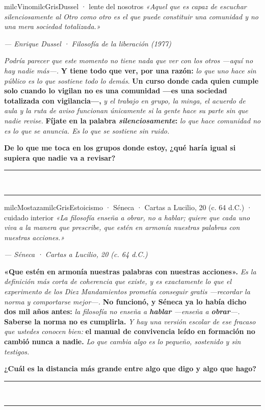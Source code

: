 \documentclass[11pt,letterpaper]{article}
\newcommand{\linead}[1]{\noindent\color{milcLinea}\rule{#1}{0.5pt}\color{milcNegro}}
\begin{document}
\begin{softbox}{milcVino}{milcGris}{Dussel · lente del nosotros}
\textit{«Aquel que es capaz de escuchar silenciosamente al Otro como otro es el que puede constituir una comunidad y no una mera sociedad totalizada.»}

{\footnotesize\itshape\color{milcNegro!70}--- Enrique Dussel · Filosofía de la liberación (1977)}

\emph{Podría parecer que este momento no tiene nada que ver con los otros ---aquí no hay nadie más---.} \textbf{Y tiene todo que ver, por una razón:} \emph{lo que uno hace sin público es lo que sostiene todo lo demás}. \textbf{Un curso donde cada quien cumple solo cuando lo vigilan no es una comunidad ---es una sociedad totalizada con vigilancia---,} \emph{y el trabajo en grupo, la minga, el acuerdo de aula y la ruta de aviso funcionan únicamente si la gente hace su parte sin que nadie revise.} \textbf{Fíjate en la palabra \emph{silenciosamente}:} \emph{lo que hace comunidad no es lo que se anuncia. Es lo que se sostiene sin ruido.}

\textbf{De lo que me toca en los grupos donde estoy, ¿qué haría igual si supiera que nadie va a revisar?}
\end{softbox}
\linead{\linewidth}\\[1mm]
\linead{\linewidth}

\begin{softbox}{milcMostaza}{milcGris}{Estoicismo · Séneca · Cartas a Lucilio, 20 (c. 64 d.C.) · cuidado interior}
\textit{«La filosofía enseña a obrar, no a hablar; quiere que cada uno viva a la manera que prescribe, que estén en armonía nuestras palabras con nuestras acciones.»}

{\footnotesize\itshape\color{milcNegro!70}--- Séneca · Cartas a Lucilio, 20 (c. 64 d.C.)}

\textbf{«Que estén en armonía nuestras palabras con nuestras acciones».} \emph{Es la definición más corta de coherencia que existe, y es exactamente lo que el experimento de los Diez Mandamientos prometía conseguir gratis ---recordar la norma y comportarse mejor---.} \textbf{No funcionó, y Séneca ya lo había dicho dos mil años antes:} \emph{la filosofía no enseña a \textbf{hablar} ---enseña a \textbf{obrar}---.} \textbf{Saberse la norma no es cumplirla.} \emph{Y hay una versión escolar de ese fracaso que ustedes conocen bien:} \textbf{el manual de convivencia leído en formación no cambió nunca a nadie.} \emph{Lo que cambia algo es lo pequeño, sostenido y sin testigos.}

\textbf{¿Cuál es la distancia más grande entre algo que digo y algo que hago?}
\end{softbox}
\linead{\linewidth}\\[1mm]
\linead{\linewidth}
\end{document}
